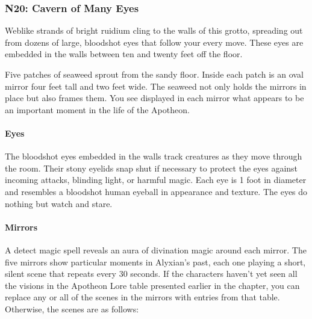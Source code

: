 \documentclass[10pt,a4paper,twoside,twocolumn,openany,nodeprecatedcode]{dndbook}
\begin{document}
\subsubsection{N20: Cavern of Many Eyes}
\begin{DndReadAloud}{}
Weblike strands of bright ruidium cling to the walls of this grotto, spreading out from dozens of large, bloodshot eyes that follow your every move. These eyes are embedded in the walls between ten and twenty feet off the floor.

Five patches of seaweed sprout from the sandy floor. Inside each patch is an oval mirror four feet tall and two feet wide. The seaweed not only holds the mirrors in place but also frames them. You see displayed in each mirror what appears to be an important moment in the life of the Apotheon.

\end{DndReadAloud}

\paragraph{Eyes}
The bloodshot eyes embedded in the walls track creatures as they move through the room. Their stony eyelids snap shut if necessary to protect the eyes against incoming attacks, blinding light, or harmful magic. Each eye is 1 foot in diameter and resembles a bloodshot human eyeball in appearance and texture. The eyes do nothing but watch and stare.

\paragraph{Mirrors}
A detect magic spell reveals an aura of divination magic around each mirror. The five mirrors show particular moments in Alyxian's past, each one playing a short, silent scene that repeats every 30 seconds. If the characters haven't yet seen all the visions in the Apotheon Lore table presented earlier in the chapter, you can replace any or all of the scenes in the mirrors with entries from that table. Otherwise, the scenes are as follows:
\end{document}
